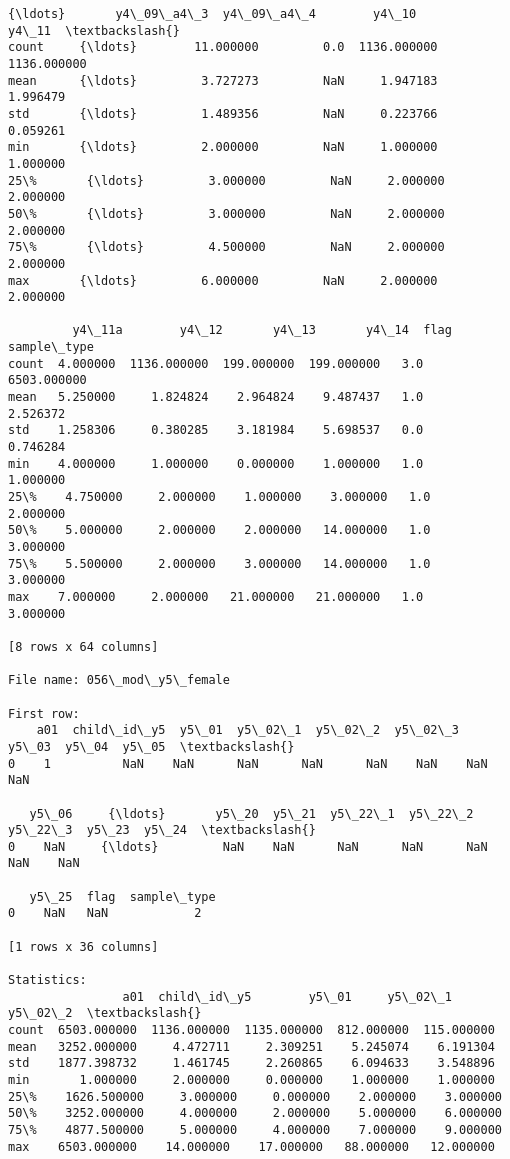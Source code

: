\documentclass[11pt]{article}
\begin{document}
\begin{Verbatim}[commandchars=\\\{\}]
          {\ldots}       y4\_09\_a4\_3  y4\_09\_a4\_4        y4\_10        y4\_11  \textbackslash{}
count     {\ldots}        11.000000         0.0  1136.000000  1136.000000   
mean      {\ldots}         3.727273         NaN     1.947183     1.996479   
std       {\ldots}         1.489356         NaN     0.223766     0.059261   
min       {\ldots}         2.000000         NaN     1.000000     1.000000   
25\%       {\ldots}         3.000000         NaN     2.000000     2.000000   
50\%       {\ldots}         3.000000         NaN     2.000000     2.000000   
75\%       {\ldots}         4.500000         NaN     2.000000     2.000000   
max       {\ldots}         6.000000         NaN     2.000000     2.000000   

         y4\_11a        y4\_12       y4\_13       y4\_14  flag  sample\_type  
count  4.000000  1136.000000  199.000000  199.000000   3.0  6503.000000  
mean   5.250000     1.824824    2.964824    9.487437   1.0     2.526372  
std    1.258306     0.380285    3.181984    5.698537   0.0     0.746284  
min    4.000000     1.000000    0.000000    1.000000   1.0     1.000000  
25\%    4.750000     2.000000    1.000000    3.000000   1.0     2.000000  
50\%    5.000000     2.000000    2.000000   14.000000   1.0     3.000000  
75\%    5.500000     2.000000    3.000000   14.000000   1.0     3.000000  
max    7.000000     2.000000   21.000000   21.000000   1.0     3.000000  

[8 rows x 64 columns]

File name: 056\_mod\_y5\_female

First row: 
    a01  child\_id\_y5  y5\_01  y5\_02\_1  y5\_02\_2  y5\_02\_3  y5\_03  y5\_04  y5\_05  \textbackslash{}
0    1          NaN    NaN      NaN      NaN      NaN    NaN    NaN    NaN   

   y5\_06     {\ldots}       y5\_20  y5\_21  y5\_22\_1  y5\_22\_2  y5\_22\_3  y5\_23  y5\_24  \textbackslash{}
0    NaN     {\ldots}         NaN    NaN      NaN      NaN      NaN    NaN    NaN   

   y5\_25  flag  sample\_type  
0    NaN   NaN            2  

[1 rows x 36 columns]

Statistics: 
                a01  child\_id\_y5        y5\_01     y5\_02\_1     y5\_02\_2  \textbackslash{}
count  6503.000000  1136.000000  1135.000000  812.000000  115.000000   
mean   3252.000000     4.472711     2.309251    5.245074    6.191304   
std    1877.398732     1.461745     2.260865    6.094633    3.548896   
min       1.000000     2.000000     0.000000    1.000000    1.000000   
25\%    1626.500000     3.000000     0.000000    2.000000    3.000000   
50\%    3252.000000     4.000000     2.000000    5.000000    6.000000   
75\%    4877.500000     5.000000     4.000000    7.000000    9.000000   
max    6503.000000    14.000000    17.000000   88.000000   12.000000   


\end{Verbatim}
\end{document}
